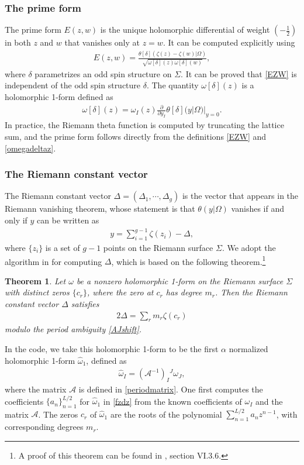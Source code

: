 \documentclass[12pt]{article}
\def\ie{\begin{equation}\begin{aligned}}
\def\fe{\end{aligned}\end{equation}}
\numberwithin{equation}{section}
\newtheorem{theorem}{Theorem}
\begin{document}
\subsubsection*{The prime form}

The prime form $E(z,w)$ is the unique holomorphic differential of weight $(-\frac{1}{2})$ in both $z$ and $w$ that vanishes only at $z=w$. It can be computed explicitly using
\ie \label{EZW}
E(z,w) = \frac{\theta[\delta](\zeta(z)-\zeta(w)|\Omega)}{\sqrt{\omega[\delta](z)\omega[\delta](w)}},
\fe
where $\delta$ parametrizes an odd spin structure on $\Sigma$. It can be proved that \eqref{EZW} is independent of the odd spin structure $\delta$. The quantity $\omega[\delta](z)$ is a holomorphic 1-form defined as
\ie \label{omegadeltaz}
\omega[\delta](z)=\omega_I(z)\frac{\partial}{\partial y_I}\theta[\delta](y|\Omega)|_{y=0}.
\fe
In practice, the Riemann theta function is computed by truncating the lattice sum, and the prime form follows directly from the definitions \eqref{EZW} and \eqref{omegadeltaz}.

\subsubsection*{The Riemann constant vector}

The Riemann constant vector $\Delta=(\Delta_1,\cdots, \Delta_g)$ is the vector that appears in the Riemann vanishing theorem, whose statement is that $\theta(y|\Omega)$ vanishes if and only if $y$ can be written as
\ie
y = \sum_{i=1}^{g-1} \zeta(z_i) - \Delta,
\fe
where $\{z_i\}$ is a set of $g-1$ points on the Riemann surface $\Sigma$. We adopt the algorithm in \cite{deconinck2015computing} for computing $\Delta$, which is based on the following theorem.\footnote{A proof of this theorem can be found in \cite{farkas1980riemann}, section VI.3.6.}
\begin{theorem}
Let $\omega$ be a nonzero holomorphic 1-form on the Riemann surface $\Sigma$ with distinct zeros $\{c_r\}$, where the zero at $c_r$ has degree $m_r$. Then the Riemann constant vector $\Delta$ satisfies
\ie \label{canonicaldiv}
2\Delta = \sum_r m_r \zeta(c_r)
\fe
modulo the period ambiguity \eqref{AJshift}.
\end{theorem}

In the code, we take this holomorphic 1-form to be the first $\alpha$ normalized holomorphic 1-form $\hat{\omega}_1$, defined as
\ie \label{anormalize}
\hat{\omega}_I = (\mathcal{A}^{-1})_I{}^J \omega_J,
\fe
where the matrix $\mathcal{A}$ is defined in \eqref{periodmatrix}. One first computes the coefficients $\{a_n\}_{n=1}^{L/2}$ for $\hat{\omega}_1$ in \eqref{fzdz} from the known coefficients of $\omega_I$ and the matrix $\mathcal{A}$. The zeros $c_r$ of $\hat{\omega}_1$ are the roots of the polynomial $\sum_{n=1}^{L/2}a_n z^{n-1}$, with corresponding degrees $m_r$. 
\end{document}
